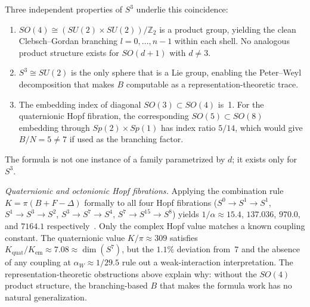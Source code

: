 \documentclass[aps,prl,twocolumn,superscriptaddress]{revtex4-2}
\begin{document}
Three independent properties of $S^3$ underlie this coincidence:
\begin{enumerate}
\item $SO(4) \cong (SU(2) \times SU(2))/\mathbb{Z}_2$ is a product
  group, yielding the clean Clebsch--Gordan branching
  $l = 0, \ldots, n{-}1$ within each shell. No analogous product
  structure exists for $SO(d{+}1)$ with $d \neq 3$.
\item $S^3 \cong SU(2)$ is the only sphere that is a Lie group,
  enabling the Peter--Weyl decomposition that makes $B$ computable
  as a representation-theoretic trace.
\item The embedding index of diagonal $SO(3) \subset SO(4)$ is~1.
  For the quaternionic Hopf fibration, the corresponding
  $SO(5) \subset SO(8)$ embedding through $Sp(2) \times Sp(1)$ has
  index ratio $5/14$, which would give $B/N = 5 \neq 7$ if used as
  the branching factor.
\end{enumerate}
The formula is not one instance of a family parametrized by $d$; it
exists only for~$S^3$.

\textit{Quaternionic and octonionic Hopf fibrations.}
Applying the combination rule $K = \pi(B + F - \Delta)$ formally to
all four Hopf fibrations
($S^0 \to S^1 \to S^1$, $S^1 \to S^3 \to S^2$,
$S^3 \to S^7 \to S^4$, $S^7 \to S^{15} \to S^8$) yields
$1/\alpha \approx 15.4$, $137.036$, $970.0$, and $7164.1$
respectively~\cite{phase6_hopf}. Only the complex Hopf value matches
a known coupling constant. The quaternionic value $K/\pi \approx 309$
satisfies $K_{\mathrm{quat}}/K_{\mathrm{em}} \approx 7.08 \approx
\dim(S^7)$, but the $1.1\%$ deviation from~7 and the absence of any
coupling at $\alpha_W \approx 1/29.5$ rule out a weak-interaction
interpretation. The representation-theoretic obstructions above
explain why: without the $SO(4)$ product structure, the
branching-based $B$ that makes the formula work has no natural
generalization.
\end{document}
